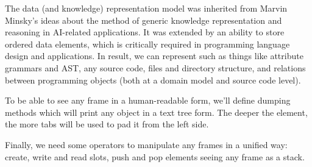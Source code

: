 \label{frame}\secdown

\clearpage

The data (and knowledge) representation model was inherited from Marvin Minsky's
ideas about the method of generic knowledge representation and reasoning in
AI-related applications. It was extended by an ability to store ordered data
elements, which is critically required in programming language design and
applications. In result, we can represent such as things like attribute grammars
and AST, any source code, files and directory structure, and relations between
programming objects (both at a domain model and source code level).


To be able to see any frame in a human-readable form, we'll define dumping
methods which will print any object in a text tree form. The deeper the element,
the more tabs will be used to pad it from the left side.

\clearpage
{}
\clearpage
{}

\clearpage
Finally, we need some operators to manipulate any frames in a unified way:
create, write and read slots, push and pop elements seeing any frame as a stack.








\secup
